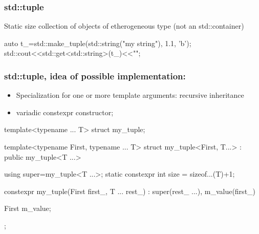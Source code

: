 \documentclass[aspectratio=43]{beamer}
\begin{document}
\begin{frame}[fragile]\frametitle{std::tuple}
  Static size collection of objects of etherogeneous type (not an std::container)
      \begin{Cpplisting}{}
auto t_=std::make_tuple(std::string("my string"), 1.1, 'b');
std::cout<<std::get<std::string>(t_)<<"\n";
      \end{Cpplisting}
\end{frame}


\begin{frame}[fragile]\frametitle{std::tuple, idea of possible implementation:}

  \begin{itemize}
  \item Specialization for one or more template arguments: \alert{recursive inheritance}
  \item variadic constexpr constructor;
  \end{itemize}
  \begin{Cpplisting}{}
template<typename ... T> struct my_tuple;

template<typename First, typename ... T>
struct my_tuple<First, T...> : public my_tuple<T ...> {
  using super=my_tuple<T ...>;
  static constexpr int size = sizeof...(T)+1;

  constexpr my_tuple(First first_, T ... rest_) : super(rest_ ...), m_value(first_){}

  First m_value;
};
    \end{Cpplisting}
\end{frame}
\end{document}

